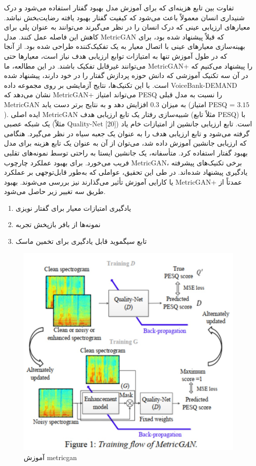 \documentclass[fleqn]{report}
\begin{document}
تفاوت بین تابع هزینه‌ای که برای آموزش مدل بهبود گفتار استفاده می‌شود و درک شنیداری انسان معمولاً باعث می‌شود که کیفیت گفتار بهبود یافته رضایت‌بخش نباشد. معیارهای ارزیابی عینی که درک انسان را در نظر می‌گیرند می‌توانند به عنوان پلی برای کاهش این فاصله عمل کنند. مدل MetricGAN که قبلاً پیشنهاد شده بود، برای بهینه‌سازی معیارهای عینی با اتصال معیار به یک تفکیک‌کننده طراحی شده بود. از آنجا که در طول آموزش تنها به امتیازات توابع ارزیابی هدف نیاز است، معیارها حتی می‌توانند غیرقابل تفکیک باشند. در این مطالعه، ما MetricGAN+ را پیشنهاد می‌کنیم که در آن سه تکنیک آموزشی که دانش حوزه پردازش گفتار را در خود دارند، پیشنهاد شده است. با این تکنیک‌ها، نتایج آزمایشی بر روی مجموعه داده VoiceBank-DEMAND نشان می‌دهد که MetricGAN+ می‌تواند امتیاز PESQ را نسبت به مدل قبلی MetricGAN به میزان 0.3 افزایش دهد و به نتایج برتر دست یابد (امتیاز PESQ = $3.15$).
ایده اصلی MetricGAN شبیه‌سازی رفتار یک تابع ارزیابی هدف (مثلاً تابع PESQ) با یک شبکه عصبی (مثلاً Quality-Net [20]) است. تابع ارزیابی جانشین از امتیازات خام یاد گرفته می‌شود و تابع ارزیابی هدف را به عنوان یک جعبه سیاه در نظر می‌گیرد. هنگامی که ارزیابی جانشین آموزش داده شد، می‌توان از آن به عنوان یک تابع هزینه برای مدل بهبود گفتار استفاده کرد. متأسفانه، یک جانشین ایستا به راحتی توسط نمونه‌های تقلبی فریب می‌خورد.
برای بهبود عملکرد چارچوب MetricGAN، برخی تکنیک‌های پیشرفته یادگیری پیشنهاد شده‌اند. در طی این تحقیق، عواملی که به‌طور قابل‌توجهی بر عملکرد یا کارایی آموزش تأثیر می‌گذارند نیز بررسی می‌شوند. بهبود MetricGAN+ عمدتاً از طریق سه تغییر زیر حاصل می‌شود.
\begin{enumerate}
    \item یادگیری امتیازات معیار برای گفتار نویزی
    \item نمونه‌ها از بافر بازپخش تجربه
    \item تابع سیگموید قابل یادگیری برای تخمین ماسک
\end{enumerate}

\begin{figure}[h]

    \centering
    \includegraphics[width=.8\textwidth, keepaspectratio]{images/metricgan.jpg}
    
    \caption{آموزش metricgan}
    \label{fig:metricgan-training}
\end{figure}
\end{document}
